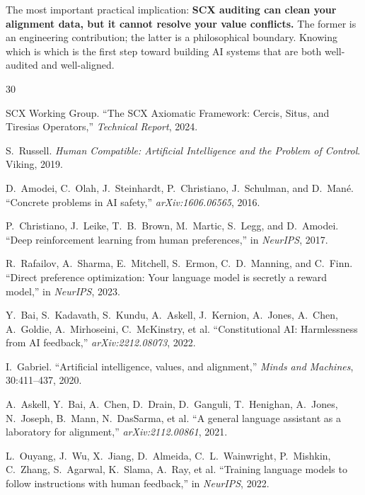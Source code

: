\documentclass[12pt,a4paper]{article}
\begin{document}
The most important practical implication: \textbf{SCX auditing can clean your
alignment data, but it cannot resolve your value conflicts.}  The former is
an engineering contribution; the latter is a philosophical boundary.  Knowing
which is which is the first step toward building AI systems that are both
well-audited and well-aligned.


\begin{thebibliography}{30}

SCX Working Group.
\newblock ``The SCX Axiomatic Framework: Cercis, Situs, and Tiresias
Operators,''
\newblock \emph{Technical Report}, 2024.

S.~Russell.
\newblock \emph{Human Compatible: Artificial Intelligence and the Problem of
Control}.
\newblock Viking, 2019.

D.~Amodei, C.~Olah, J.~Steinhardt, P.~Christiano, J.~Schulman, and D.~Man\'e.
\newblock ``Concrete problems in AI safety,''
\newblock \emph{arXiv:1606.06565}, 2016.

P.~Christiano, J.~Leike, T.~B.~Brown, M.~Martic, S.~Legg, and D.~Amodei.
\newblock ``Deep reinforcement learning from human preferences,''
\newblock in \emph{NeurIPS}, 2017.

R.~Rafailov, A.~Sharma, E.~Mitchell, S.~Ermon, C.~D.~Manning, and C.~Finn.
\newblock ``Direct preference optimization: Your language model is secretly a
reward model,''
\newblock in \emph{NeurIPS}, 2023.

Y.~Bai, S.~Kadavath, S.~Kundu, A.~Askell, J.~Kernion, A.~Jones, A.~Chen,
A.~Goldie, A.~Mirhoseini, C.~McKinstry, et al.
\newblock ``Constitutional AI: Harmlessness from AI feedback,''
\newblock \emph{arXiv:2212.08073}, 2022.

I.~Gabriel.
\newblock ``Artificial intelligence, values, and alignment,''
\newblock \emph{Minds and Machines}, 30:411--437, 2020.

A.~Askell, Y.~Bai, A.~Chen, D.~Drain, D.~Ganguli, T.~Henighan, A.~Jones,
N.~Joseph, B.~Mann, N.~DasSarma, et al.
\newblock ``A general language assistant as a laboratory for alignment,''
\newblock \emph{arXiv:2112.00861}, 2021.

L.~Ouyang, J.~Wu, X.~Jiang, D.~Almeida, C.~L.~Wainwright, P.~Mishkin,
C.~Zhang, S.~Agarwal, K.~Slama, A.~Ray, et al.
\newblock ``Training language models to follow instructions with human
feedback,''
\newblock in \emph{NeurIPS}, 2022.


\end{thebibliography}
\end{document}
